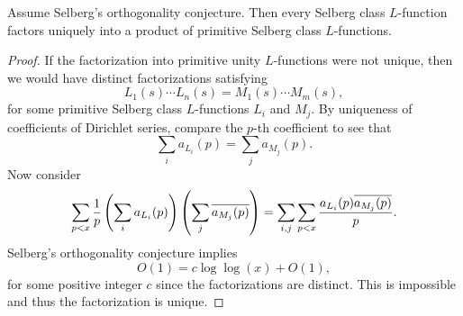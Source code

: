    \begin{proposition}
      Assume Selberg's orthogonality conjecture. Then every Selberg class \(L\)-function factors uniquely into a product of primitive Selberg class \(L\)-functions.
    \end{proposition}
    \begin{proof}
      If the factorization into primitive unity \(L\)-functions were not unique, then we would have distinct factorizations satisfying
      \[
        L_{1}(s) \cdots L_{n}(s) = M_{1}(s) \cdots M_{m}(s),
      \]
      for some primitive Selberg class \(L\)-functions \(L_{i}\) and \(M_{j}\). By uniqueness of coefficients of Dirichlet series, compare the \(p\)-th coefficient to see that
      \[
        \sum_{i}a_{L_{i}}(p) = \sum_{j}a_{M_{j}}(p).
      \]
      Now consider
      \[
        \sum_{p < x}\frac{1}{p}\left(\sum_{i}a_{L_{i}}(p)\right)\left(\sum_{j}\overline{a_{M_{j}}(p)}\right) = \sum_{i,j}\sum_{p < x}\frac{a_{L_{i}}(p)\overline{a_{M_{j}}(p)}}{p}.
      \]
      Selberg's orthogonality conjecture implies
      \[
        O(1) = c\log\log(x)+O(1),
      \]
      for some positive integer \(c\) since the factorizations are distinct. This is impossible and thus the factorization is unique.
    \end{proof}

